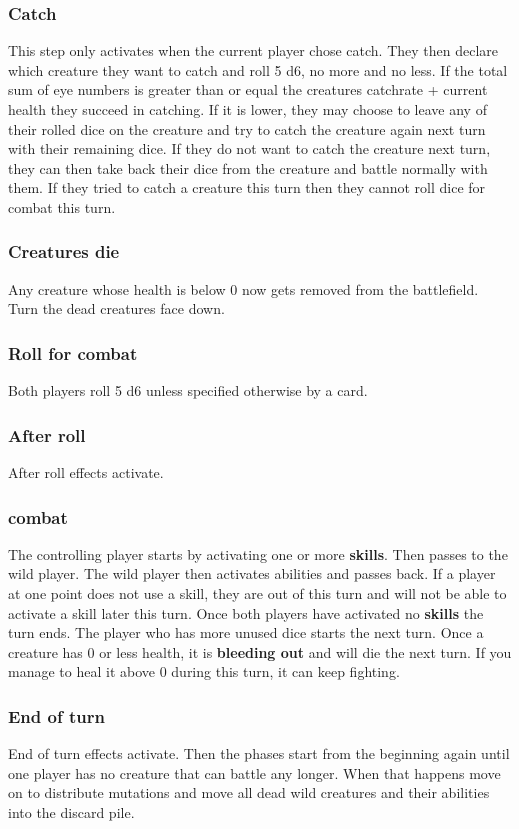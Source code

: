 \documentclass[a4paper,12pt]{article}
\begin{document}
\subsubsection{Catch}
This step only activates when the current player chose catch.
They then declare which creature they want to catch and roll 5 d6, no more and no less.
If the total sum of eye numbers is greater than or equal the creatures 
catchrate + current health they succeed in catching.
If it is lower, they may choose to leave any of their rolled dice on the creature and try to catch the creature again next turn with their remaining dice.
If they do not want to catch the creature next turn, they can then take back their dice from the creature and battle normally with them.
If they tried to catch a creature this turn then they cannot roll dice for combat this turn. 
\subsubsection{Creatures die}
Any creature whose health is below 0 now gets removed from the battlefield. Turn the dead creatures face down. 
\subsubsection{Roll for combat}
Both players roll 5 d6 unless specified otherwise by a card.
\subsubsection{After roll}
After roll effects activate.
\subsubsection{combat}
The controlling player starts by activating one or more \textbf{skills}. Then passes to the wild player. The wild player then activates abilities and passes back.
If a player at one point does not use a skill, they are out of this turn and will not be able to activate a skill later this turn. Once both players have activated no \textbf{skills} the turn ends. The player who has more unused dice starts the next turn.
Once a creature has 0 or less health, it is \textbf{bleeding out} and will die the next turn. If you manage to heal it above 0 during this turn, it can keep fighting.
\\
\subsubsection{End of turn}
End of turn effects activate. Then the phases start from the beginning again until one player has no creature that can battle any longer. When that happens move on to distribute mutations and move all dead wild creatures and their abilities into the discard pile.
\\
\end{document}
